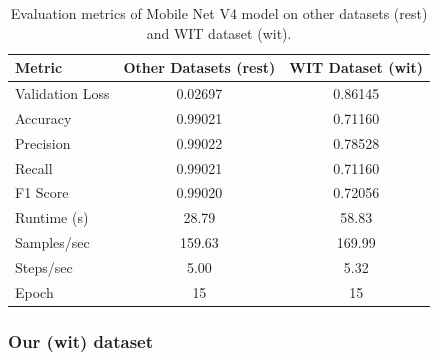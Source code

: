 \documentclass[a4paper]{article}
\begin{document}
\begin{table}[H]
    \centering
    \caption{Evaluation metrics of Mobile Net V4 model on other datasets (rest) and WIT dataset (wit).}
    \label{tab:mobile_net_eval}
    \begin{tabular}{lcc}
        \toprule
        \textbf{Metric} & \textbf{Other Datasets (rest)} & \textbf{WIT Dataset (wit)} \\
        \midrule
        Validation Loss      & 0.02697   & 0.86145 \\
        Accuracy             & 0.99021   & 0.71160 \\
        Precision            & 0.99022   & 0.78528 \\
        Recall               & 0.99021   & 0.71160 \\
        F1 Score             & 0.99020   & 0.72056 \\
        Runtime (s)          & 28.79     & 58.83 \\
        Samples/sec          & 159.63    & 169.99 \\
        Steps/sec            & 5.00      & 5.32 \\
        Epoch                & 15        & 15 \\
        \bottomrule
    \end{tabular}
\end{table}

\subsubsection{Our (wit) dataset}
\end{document}
